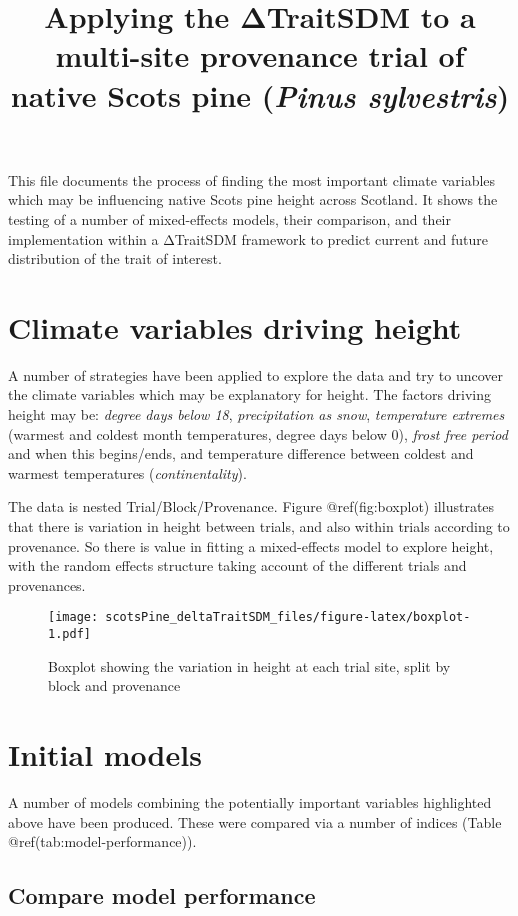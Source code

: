\documentclass[]{article}
\title{Applying the ΔTraitSDM to a multi-site provenance trial of native Scots
pine (\emph{Pinus sylvestris})}
\author{}
\date{\vspace{-2.5em}}
\begin{document}
\maketitle

This file documents the process of finding the most important climate
variables which may be influencing native Scots pine height across
Scotland. It shows the testing of a number of mixed-effects models,
their comparison, and their implementation within a ΔTraitSDM framework
to predict current and future distribution of the trait of interest.

\section{Climate variables driving
height}\label{climate-variables-driving-height}

A number of strategies have been applied to explore the data and try to
uncover the climate variables which may be explanatory for height. The
factors driving height may be: \emph{degree days below 18},
\emph{precipitation as snow}, \emph{temperature extremes} (warmest and
coldest month temperatures, degree days below 0), \emph{frost free
period} and when this begins/ends, and temperature difference between
coldest and warmest temperatures (\emph{continentality}).

The data is nested Trial/Block/Provenance. Figure @ref(fig:boxplot)
illustrates that there is variation in height between trials, and also
within trials according to provenance. So there is value in fitting a
mixed-effects model to explore height, with the random effects structure
taking account of the different trials and provenances.

\begin{figure}
\centering
\texttt{[image: scotsPine\_deltaTraitSDM\_files/figure-latex/boxplot-1.pdf]}
\caption{Boxplot showing the variation in height at each trial site,
split by block and provenance}
\end{figure}

\section{Initial models}\label{initial-models}

A number of models combining the potentially important variables
highlighted above have been produced. These were compared via a number
of indices (Table @ref(tab:model-performance)).

\subsection{Compare model performance}\label{compare-model-performance}
\end{document}
